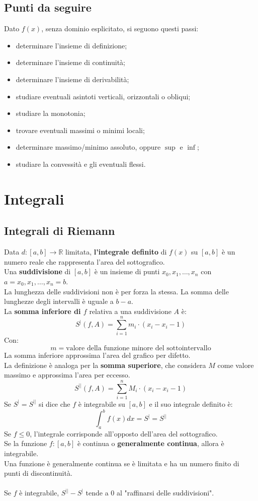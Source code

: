 \documentclass[12pt,a4paper]{article}
\let\oldsection\section
\renewcommand{\section}{\clearpage\oldsection}
\begin{document}
\subsection{Punti da seguire}

Dato $f(x)$, senza dominio esplicitato, si seguono questi passi:

\begin{itemize}
  \item determinare l’insieme di definizione;  
  \item determinare l’insieme di continuità;  
  \item determinare l’insieme di derivabilità;  
  \item studiare eventuali asintoti verticali, orizzontali o obliqui;  
  \item studiare la monotonia;  
  \item trovare eventuali massimi o minimi locali;  
  \item determinare massimo/minimo assoluto, oppure $\sup$ e $\inf$;  
  \item studiare la convessità e gli eventuali flessi.
\end{itemize}

\section{Integrali}
\subsection{Integrali di Riemann}
Data $d:[a,b] \rightarrow \mathbb{R}$ limitata, \textbf{l'integrale definito} di $f(x)$ su $[a,b]$ è un numero reale che rappresenta l'area del sottografico.\\
Una \textbf{suddivisione} di $[a,b]$ è un insieme di punti $x_0, x_1,\ldots, x_n$ con $a = x_0, x_1,\ldots, x_n = b$.\\
La lunghezza delle suddivisioni non è per forza la stessa. La somma delle lunghezze degli intervalli è uguale a $b-a$.\\
La \textbf{somma inferiore di $f$} relativa a una suddivisione $A$ è:
\[
S^|(f,A) = \sum_{i = 1}^{n} m_i \cdot (x_i - x_i - 1)
\]
Con:
\[
m = \text{valore della funzione minore del sottointervallo}
\]
La somma inferiore approssima l'area del grafico per difetto.\\
La definizione è analoga per la \textbf{somma superiore}, che considera $M$ come valore massimo e approssima l'area per eccesso.
\[
S^{||}(f,A) = \sum_{i = 1}^{n} M_i \cdot (x_i - x_i - 1)
\]
Se $S^| = S^{||}$ si dice che $f$ è integrabile su $[a,b]$ e il suo integrale definito è:
\[
\int_{a}^{b} f(x) dx = S^| = S^{||}
\]
Se $f \leq 0$, l'integrale corrisponde all'opposto dell'area del sottografico.\\
Se la funzione $f:[a,b]$ è continua o \textbf{generalmente continua}, allora è integrabile.\\
Una funzione è generalmente continua se è limitata e ha un numero finito di punti di discontinuità.\\\\
Se $f$ è integrabile, $S^{||} - S^|$ tende a $0$ al "raffinarsi delle suddivisioni".
\end{document}
